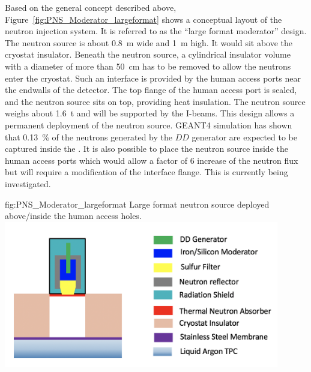 Based on the general concept described above, Figure~\ref{fig:PNS_Moderator_largeformat} shows a conceptual layout of the neutron injection system. It is referred to as the ``large format moderator'' design. The neutron source is about \SI{0.8}{\m} wide and \SI{1}{\m} high. It would sit above the cryostat insulator. Beneath the neutron source, a cylindrical insulator volume with a diameter of more than \SI{50}{\cm} has to be removed to allow the neutrons enter the cryostat. Such an interface is provided by the human access ports near the endwalls of the detector.
The top flange of the human access port is sealed, and the neutron source sits on top, providing heat insulation. The neutron source weighs about \SI{1.6}{\tonne} and will be supported by the I-beams. 
This design allows a permanent deployment of the neutron source. GEANT4 simulation has shown that \SI{0.13}{\%} of the neutrons generated by the $DD$ generator are expected to be captured inside the . It is also possible to place the neutron source inside the human access ports which would allow a factor of \num{6} increase of the neutron flux but will require a modification of the interface flange. This is currently being investigated.

\begin{dunefigure}{fig:PNS_Moderator_largeformat}
{Large format neutron source deployed above/inside the human access holes.}
\includegraphics[width=12cm]{graphics/PNS_Moderator_largeformat.png}
\end{dunefigure}



